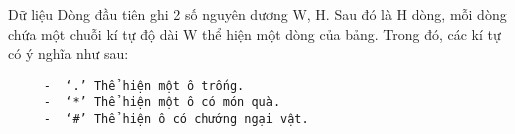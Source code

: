 Dữ liệu
Dòng đầu tiên ghi 2 số nguyên dương W, H. Sau đó là H dòng, mỗi dòng chứa một chuỗi kí tự độ dài W thể hiện một dòng của bảng. Trong đó, các kí tự có ý nghĩa như sau:  
\begin{verbatim}
     -	‘.’ Thể hiện một ô trống.
     -	‘*’ Thể hiện một ô có món quà.
     -	‘#’ Thể hiện ô có chướng ngại vật.
\end{verbatim}